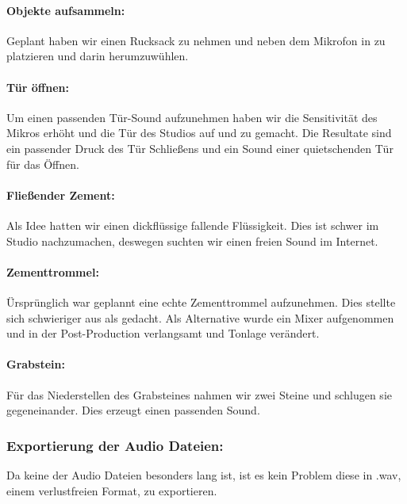 \paragraph{Objekte aufsammeln:}
Geplant haben wir einen Rucksack zu nehmen und neben dem Mikrofon in zu platzieren und darin herumzuwühlen.

\paragraph{Tür öffnen:}
Um einen passenden Tür-Sound aufzunehmen haben wir die Sensitivität des Mikros erhöht und die Tür des Studios auf und
zu gemacht. Die Resultate sind ein passender Druck des Tür Schließens und ein Sound einer quietschenden Tür für das Öffnen.

\paragraph{Fließender Zement:}
Als Idee hatten wir einen dickflüssige fallende Flüssigkeit. Dies ist schwer im Studio nachzumachen,
deswegen suchten wir einen freien Sound im Internet.

\paragraph{Zementtrommel:}
Ürsprünglich war geplannt eine echte Zementtrommel aufzunehmen. Dies stellte sich schwieriger
aus als gedacht. Als Alternative wurde ein Mixer aufgenommen und in der Post-Production verlangsamt und Tonlage verändert.

\paragraph{Grabstein:}
Für das Niederstellen des Grabsteines nahmen wir zwei Steine und schlugen sie gegeneinander. Dies erzeugt einen passenden Sound.

\subsubsection{Exportierung der Audio Dateien:}
Da keine der Audio Dateien besonders lang ist, ist es kein Problem diese in .wav, einem verlustfreien Format, zu exportieren.
